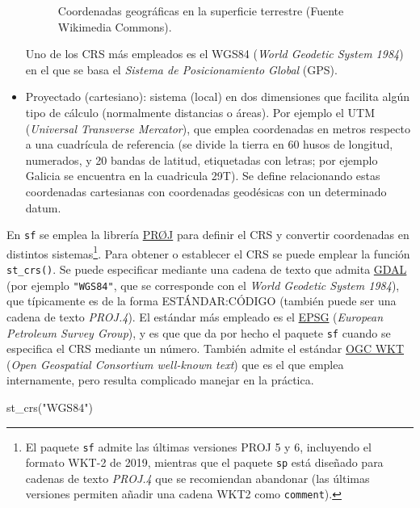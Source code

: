 \documentclass[
  spanish,
]{book}
\newenvironment{Shaded}{\begin{snugshade}}{\end{snugshade}}
\newcommand{\FunctionTok}[1]{\textcolor[rgb]{0.00,0.00,0.00}{#1}}
\newcommand{\NormalTok}[1]{#1}
\newcommand{\StringTok}[1]{\textcolor[rgb]{0.31,0.60,0.02}{#1}}
\theoremstyle{break}
\theoremstyle{definition}
\theoremstyle{definition}
\theoremstyle{definition}
\theoremstyle{definition}
\theoremstyle{remark}
\begin{document}
\begin{itemize}
\begin{figure}[!htb]
{    }

    \caption{Coordenadas geográficas en la superficie terrestre (Fuente Wikimedia Commons).}\label{fig:latlon}
    \end{figure}

  Uno de los CRS más empleados es el WGS84 (\emph{World Geodetic System 1984}) en el que se basa el \emph{Sistema de Posicionamiento Global} (GPS).
\item
  Proyectado (cartesiano): sistema (local) en dos dimensiones que facilita algún tipo de cálculo (normalmente distancias o áreas). Por ejemplo el UTM (\emph{Universal Transverse Mercator}), que emplea coordenadas en metros respecto a una cuadrícula de referencia (se divide la tierra en 60 husos de longitud, numerados, y 20 bandas de latitud, etiquetadas con letras; por ejemplo Galicia se encuentra en la cuadricula 29T). Se define relacionando estas coordenadas cartesianas con coordenadas geodésicas con un determinado datum.
\end{itemize}

En \texttt{sf} se emplea la librería \href{http://proj.org/}{PRØJ} para definir el CRS y convertir coordenadas en distintos sistemas\footnote{El paquete \texttt{sf} admite las últimas versiones PROJ 5 y 6, incluyendo el formato WKT-2 de 2019, mientras que el paquete \texttt{sp} está diseñado para cadenas de texto \emph{PROJ.4} que se recomiendan abandonar (las últimas versiones permiten añadir una cadena WKT2 como \texttt{comment}).}.
Para obtener o establecer el CRS se puede emplear la función \texttt{st\_crs()}.
Se puede especificar mediante una cadena de texto que admita \href{https://gdal.org/tutorials/osr_api_tut.html}{GDAL} (por ejemplo \texttt{"WGS84"}, que se corresponde con el \emph{World Geodetic System 1984}), que típicamente es de la forma ESTÁNDAR:CÓDIGO (también puede ser una cadena de texto \emph{PROJ.4}).
El estándar más empleado es el \href{https://epsg.org}{EPSG} (\emph{European Petroleum Survey Group}), y es que que da por hecho el paquete \texttt{sf} cuando se especifica el CRS mediante un número.
También admite el estándar \href{http://www.opengeospatial.org/standards/wkt-crs}{OGC WKT} (\emph{Open Geospatial Consortium well-known text}) que es el que emplea internamente, pero resulta complicado manejar en la práctica.

\begin{Shaded}
\begin{Highlighting}[]
\FunctionTok{st\_crs}\NormalTok{(}\StringTok{"WGS84"}\NormalTok{)}
\end{Highlighting}
\end{Shaded}
\end{document}
